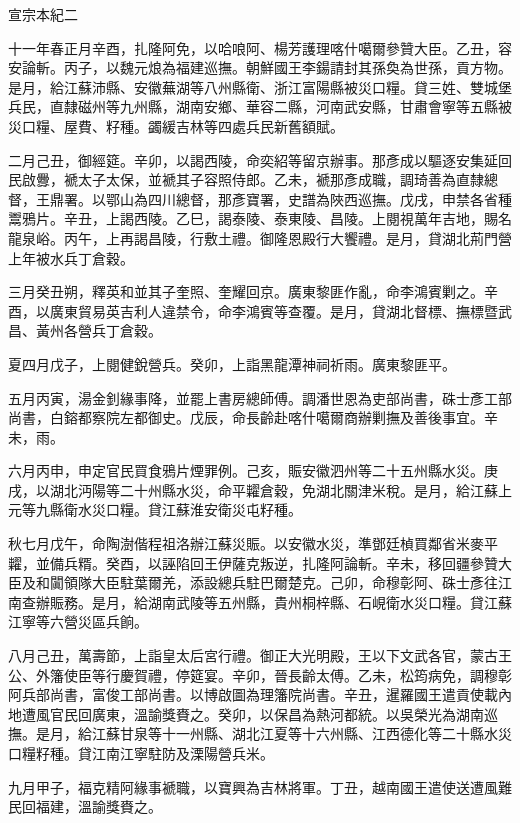 
\begin{pinyinscope}
宣宗本紀二

十一年春正月辛酉，扎隆阿免，以哈哴阿、楊芳護理喀什噶爾參贊大臣。乙丑，容安論斬。丙子，以魏元烺為福建巡撫。朝鮮國王李鍚請封其孫奐為世孫，貢方物。是月，給江蘇沛縣、安徽蕪湖等八州縣衛、浙江富陽縣被災口糧。貸三姓、雙城堡兵民，直隸磁州等九州縣，湖南安鄉、華容二縣，河南武安縣，甘肅會寧等五縣被災口糧、屋費、籽種。蠲緩吉林等四處兵民新舊額賦。

二月己丑，御經筵。辛卯，以謁西陵，命奕紹等留京辦事。那彥成以驅逐安集延回民啟釁，褫太子太保，並褫其子容照侍郎。乙未，褫那彥成職，調琦善為直隸總督，王鼎署。以鄂山為四川總督，那彥寶署，史譜為陜西巡撫。戊戌，申禁各省種鬻鴉片。辛丑，上謁西陵。乙巳，謁泰陵、泰東陵、昌陵。上閱視萬年吉地，賜名龍泉峪。丙午，上再謁昌陵，行敷土禮。御隆恩殿行大饗禮。是月，貸湖北荊門營上年被水兵丁倉穀。

三月癸丑朔，釋英和並其子奎照、奎耀回京。廣東黎匪作亂，命李鴻賓剿之。辛酉，以廣東貿易英吉利人違禁令，命李鴻賓等查覆。是月，貸湖北督標、撫標暨武昌、黃州各營兵丁倉穀。

夏四月戊子，上閱健銳營兵。癸卯，上詣黑龍潭神祠祈雨。廣東黎匪平。

五月丙寅，湯金釗緣事降，並罷上書房總師傅。調潘世恩為吏部尚書，硃士彥工部尚書，白鎔都察院左都御史。戊辰，命長齡赴喀什噶爾商辦剿撫及善後事宜。辛未，雨。

六月丙申，申定官民買食鴉片煙罪例。己亥，賑安徽泗州等二十五州縣水災。庚戌，以湖北沔陽等二十州縣水災，命平糶倉穀，免湖北關津米稅。是月，給江蘇上元等九縣衛水災口糧。貸江蘇淮安衛災屯籽種。

秋七月戊午，命陶澍偕程祖洛辦江蘇災賑。以安徽水災，準鄧廷楨買鄰省米麥平糶，並備兵糈。癸酉，以誣陷回王伊薩克叛逆，扎隆阿論斬。辛未，移回疆參贊大臣及和闐領隊大臣駐葉爾羌，添設總兵駐巴爾楚克。己卯，命穆彰阿、硃士彥往江南查辦賑務。是月，給湖南武陵等五州縣，貴州桐梓縣、石峴衛水災口糧。貸江蘇江寧等六營災區兵餉。

八月己丑，萬壽節，上詣皇太后宮行禮。御正大光明殿，王以下文武各官，蒙古王公、外籓使臣等行慶賀禮，停筵宴。辛卯，晉長齡太傅。乙未，松筠病免，調穆彰阿兵部尚書，富俊工部尚書。以博啟圖為理籓院尚書。辛丑，暹羅國王遣貢使載內地遭風官民回廣東，溫諭獎賚之。癸卯，以保昌為熱河都統。以吳榮光為湖南巡撫。是月，給江蘇甘泉等十一州縣、湖北江夏等十六州縣、江西德化等二十縣水災口糧籽種。貸江南江寧駐防及溧陽營兵米。

九月甲子，福克精阿緣事褫職，以寶興為吉林將軍。丁丑，越南國王遣使送遭風難民回福建，溫諭獎賚之。


\end{pinyinscope}
